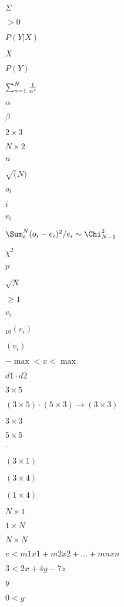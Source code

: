 \documentclass{article}
\begin{document}
$\Sigma$
\pagebreak

$>0$
\pagebreak

$P(Y|X)$
\pagebreak

$X$
\pagebreak

$P(Y)$
\pagebreak

$\sum_{n=1}^N {1\over n^s}$
\pagebreak

$\alpha$
\pagebreak

$\beta$
\pagebreak

$ 2\times 3$
\pagebreak

$N \times 2$
\pagebreak

$n$
\pagebreak

$\sqrt(N)$
\pagebreak

$o_i$
\pagebreak

$i$
\pagebreak

$e_i$
\pagebreak

$\Sum_i^N (o_i-e_i)^2/e_i \sim \Chi^2_{N-1}$
\pagebreak

$\chi^2$
\pagebreak

$p$
\pagebreak

$\sqrt{N}$
\pagebreak

$\geq 1$
\pagebreak

$v_i$
\pagebreak

$_{10}(v_i)$
\pagebreak

$(v_i)$
\pagebreak

$-\max < x < \max$
\pagebreak

$ d1 \cdot d2$
\pagebreak

$3 \times 5$
\pagebreak

$(3 \times 5) \cdot (5 \times 3) \rightarrow (3 \times 3)$
\pagebreak

$3 \times 3$
\pagebreak

$5 \times 5$
\pagebreak

$\cdot$
\pagebreak

$(3\times 1)$
\pagebreak

$(3\times 4)$
\pagebreak

$(1 \times 4)$
\pagebreak

$N \times 1$
\pagebreak

$1 \times N$
\pagebreak

$N \times N$
\pagebreak

$v < m1x1+ m2x2 + ... + mnxn$
\pagebreak

$3 < 2x + 4y - 7z$
\pagebreak

$y$
\pagebreak

$0 < y$
\pagebreak
\end{document}
